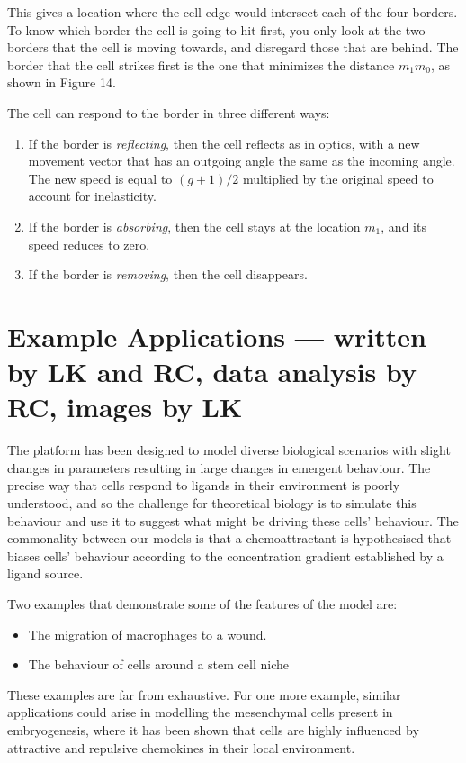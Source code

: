 \documentclass[12pt]{article}
\begin{document}
This gives a location where the cell-edge would intersect each of the
four borders. To know which border the cell is going to hit 
first, you only look at the two borders that the cell is moving towards, 
and disregard those that are behind. The border that the cell strikes 
first is the one that minimizes the distance \(m_1m_0\), as 
shown in Figure 14. 

The cell can respond to the border in three different ways: 

\begin{enumerate}
  \item If the border is {\itshape reflecting}, then the cell reflects as in optics, 
with a new movement vector that has an outgoing angle the same as the 
incoming angle. The new speed is equal to \((g+1)/2\) multiplied by the original speed
to account for inelasticity.
\item If the border is {\itshape absorbing}, then the cell stays at the location \(m_1\), 
  and its speed reduces to zero.
\item If the border is {\itshape removing}, then the cell disappears.
\end{enumerate}

\section{Example Applications --- written by LK and RC, data analysis by RC, images by LK}
The platform has been designed to model diverse biological scenarios with 
slight changes in parameters resulting in large changes in emergent 
behaviour. The precise way that cells respond to ligands in their environment is poorly
understood, \cite{cai} and so the challenge for theoretical biology is to simulate 
this behaviour and use it to suggest what might be driving these cells' behaviour.
The commonality between our models is that a 
chemoattractant is hypothesised that biases cells' behaviour according 
to the concentration gradient established by a ligand source.

Two examples that demonstrate some of the features of the model are:

\begin{itemize}
\item The migration of macrophages to a wound.
\item The behaviour of cells around a stem cell niche
\end{itemize}

These examples are far from exhaustive. For one more example, similar 
applications could arise in modelling the mesenchymal cells present in 
embryogenesis,\cite{caplan91} \cite{merks05} where it has been shown that cells are highly influenced 
by attractive and repulsive chemokines in their local environment.
\end{document}
